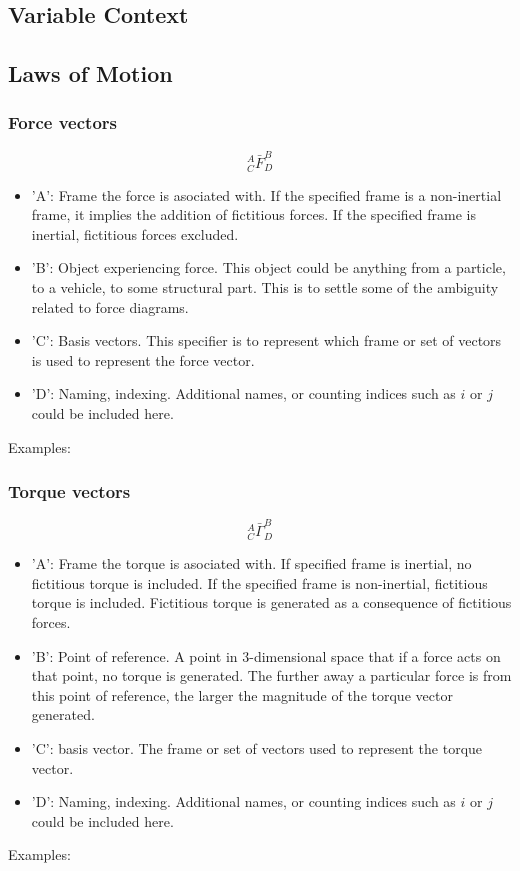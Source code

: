 \documentclass[a4paper, 12pt]{report}
\begin{document}
\begin{center}
\section{Variable Context}
\begin{comment}
\end{comment}
\subsection{Laws of Motion}
\begin{comment}
\end{comment}
\subsubsection{Force vectors}
\begin{comment}
\end{comment}
$${}^{A}_{C}\bar{F}^{B}_{D}$$
\begin{itemize}
    \item 'A': Frame the force is asociated with. If the specified frame is a non-inertial frame, it implies the addition of fictitious forces. If the specified frame is inertial, fictitious forces excluded.
    \item 'B': Object experiencing force. This object could be anything from a particle, to a vehicle, to some structural part. This is to settle some of the ambiguity related to force diagrams.
    \item 'C': Basis vectors. This specifier is to represent which frame or set of vectors is used to represent the force vector.
    \item 'D': Naming, indexing. Additional names, or counting indices such as $i$ or $j$ could be included here.
\end{itemize}
Examples:
\subsubsection{Torque vectors}
\begin{comment}
\end{comment}
$${}^{A}_{C}\bar{\Gamma}^{B}_{D}$$
\begin{itemize}
    \item 'A': Frame the torque is asociated with. If specified frame is inertial, no fictitious torque is included. If the specified frame is non-inertial, fictitious torque is included. Fictitious torque is generated as a consequence of fictitious forces.
    \item 'B': Point of reference. A point in $3$-dimensional space that if a force acts on that point, no torque is generated. The further away a particular force is from this point of reference, the larger the magnitude of the torque vector generated.
    \item 'C': basis vector. The frame or set of vectors used to represent the torque vector.
    \item 'D': Naming, indexing. Additional names, or counting indices such as $i$ or $j$ could be included here.
\end{itemize}
Examples:

\end{center}
\end{document}
